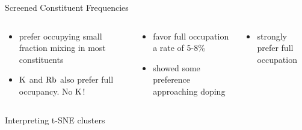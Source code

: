 \documentclass[10pt, aspectratio=169, presentation]{beamer}
\begin{document}
\begin{frame}[label={sec:orge477fb2}]{Screened Constituent Frequencies}
 
\begin{center}

\end{center}

\begin{columns}
\begin{column}{0.3\columnwidth}
\begin{itemize}
\item prefer occupying small fraction mixing in most constituents
\item \(\ce{K}\) and \(\ce{Rb}\) also prefer full occupancy. No \(\ce{K}\)!
\end{itemize}
\end{column}

\begin{column}{0.3\columnwidth}
\begin{itemize}
\item favor full occupation a rate of 5-8\%
\item showed some preference approaching doping
\end{itemize}
\end{column}

\begin{column}{0.3\columnwidth}
\begin{itemize}
\item strongly prefer full occupation
\end{itemize}
\end{column}
\end{columns}
\end{frame}

\begin{frame}[label={sec:orgcb5266d}]{Interpreting t-SNE clusters}
\begin{columns}
\begin{column}{0.5\columnwidth}
 
\begin{center}

\end{center}
\end{column}

\begin{column}{0.5\columnwidth}
 
\begin{center}

\end{center}
\end{column}
\end{columns}
\end{frame}
\end{document}
